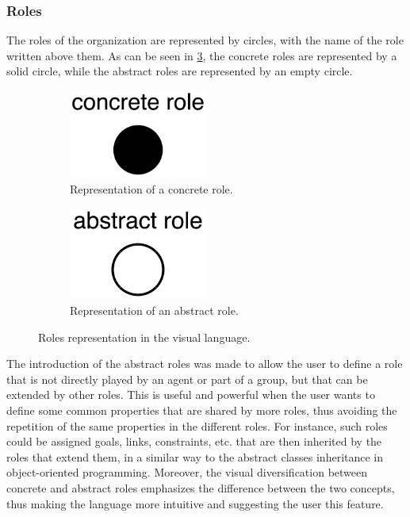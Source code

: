 \subsubsection{Roles}
The roles of the organization are represented by circles, with the name of the role written above them.
As can be seen in \cref{fig:roles}, the concrete roles are represented by a solid circle, while the abstract roles are represented by an empty circle.

\begin{figure}[H]
    \begin{subfigure}[h]{0.5\linewidth}
        \begin{center}
            \includegraphics[width=0.5\textwidth]{images/visual-language/concrete-role.png}
            \caption{Representation of a concrete role.}
            \label{fig:concrete-role}
        \end{center}
    \end{subfigure}
    \begin{subfigure}[h]{0.5\linewidth}
        \begin{center}
            \includegraphics[width=0.5\textwidth]{images/visual-language/abstract-role.png}
            \caption{Representation of an abstract role.}
            \label{fig:abstract-role}
        \end{center}
    \end{subfigure}
    \caption{Roles representation in the visual language.}
    \label{fig:roles}
\end{figure}

The introduction of the abstract roles was made to allow the user to define a role that is not directly played by an agent or part of a group, but that can be extended by other roles.
This is useful and powerful when the user wants to define some common properties that are shared by more roles, thus avoiding the repetition of the same properties in the different roles.
For instance, such roles could be assigned goals, links, constraints, etc. that are then inherited by the roles that extend them, in a similar way to the abstract classes inheritance in object-oriented programming.
Moreover, the visual diversification between concrete and abstract roles emphasizes the difference between the two concepts, thus making the language more intuitive and suggesting the user this feature.


